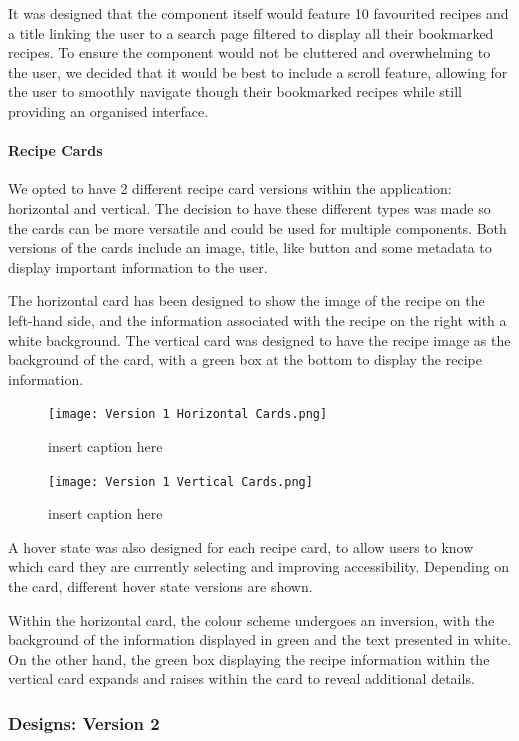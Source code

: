 \documentclass{article}
\begin{document}
It was designed that the component itself would feature 10 favourited recipes and a title linking the user to a search page filtered to display all their bookmarked recipes. To ensure the component would not be cluttered and overwhelming to the user, we decided that it would be best to include a scroll feature, allowing for the user to smoothly navigate though their bookmarked recipes while still providing an organised interface. 

\paragraph{Recipe Cards}
We opted to have 2 different recipe card versions within the application: horizontal and vertical. The decision to have these different types was made so the cards can be more versatile and could be used for multiple components. Both versions of the cards include an image, title, like button and some metadata to display important information to the user. 

The horizontal card has been designed to show the image of the recipe on the left-hand side, and the information associated with the recipe on the right with a white background. The vertical card was designed to have the recipe image as the background of the card, with a green box at the bottom to display the recipe information.

\begin{figure}[htbp]
  \texttt{[image: Version 1 Horizontal Cards.png]}
  \centering
  \caption{insert caption here}
\end{figure}

\begin{figure}[htbp]
  \texttt{[image: Version 1 Vertical Cards.png]}
  \centering
  \caption{insert caption here}
\end{figure}

A hover state was also designed for each recipe card, to allow users to know which card they are currently selecting and improving accessibility. Depending on the card, different hover state versions are shown. 

Within the horizontal card, the colour scheme undergoes an inversion, with the background of the information displayed in green and the text presented in white. On the other hand, the green box displaying the recipe information within the vertical card expands and raises within the card to reveal additional details.
    
\subsubsection{Designs: Version 2}
\end{document}
